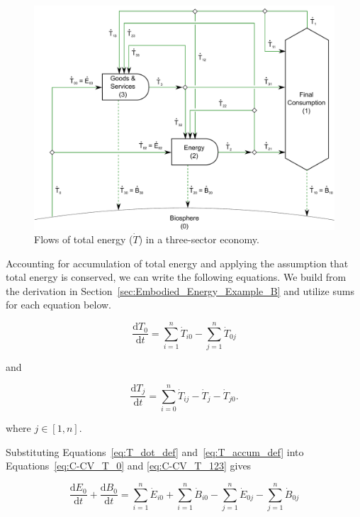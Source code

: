 \begin{figure}[!ht]
\includegraphics[width=1.0\linewidth]{Part_1/Chapter_Embodied/images/3_sector_embodied_energy.pdf}
\caption[Flows of total energy in a three-sector economy]{Flows of total energy ($\dot{T}$) in a three-sector economy.}
\label{fig:C_total_energy}
\end{figure}

Accounting for accumulation of total energy and 
applying the assumption that total energy is conserved, 
we can write the following equations.
We build from the derivation in Section~\ref{sec:Embodied_Energy_Example_B}
and utilize sums for each equation below.

\begin{equation} \label{eq:C-CV_T_0}
	\frac{\mathrm{d}T_{0}}{\mathrm{d}t} 	 
	= \sum\limits_{i=1}^{n} \dot{T}_{i0}
	- \sum\limits_{j=1}^{n} \dot{T}_{0j}
\end{equation}

\noindent and

\begin{equation} \label{eq:C-CV_T_123}
	\frac{\mathrm{d}T_{j}}{\mathrm{d}t} 	 
	= \sum\limits_{i=0}^{n} \dot{T}_{ij}
	- \dot{T}_{j}
	- \dot{T}_{j0}.
\end{equation}

\noindent where $j \in [1, n]$.

Substituting Equations~\ref{eq:T_dot_def} 
and~\ref{eq:T_accum_def} into 
Equations~\ref{eq:C-CV_T_0} and
\ref{eq:C-CV_T_123} gives

\begin{equation} \label{eq:C-CV_dB_0}
	\frac{\mathrm{d}E_{0}}{\mathrm{d}t}
	+ \frac{\mathrm{d}B_{0}}{\mathrm{d}t} 	 
	= \sum\limits_{i=1}^{n} \dot{E}_{i0}
	+ \sum\limits_{i=1}^{n} \dot{B}_{i0}
	- \sum\limits_{j=1}^{n} \dot{E}_{0j}
	- \sum\limits_{j=1}^{n} \dot{B}_{0j}
\end{equation}

